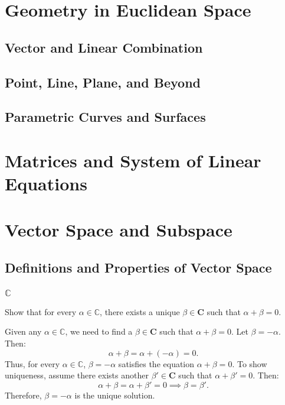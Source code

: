 \chapter{Geometry in Euclidean Space}
\section{Vector and Linear Combination}

\section{Point, Line, Plane, and Beyond}

\section{Parametric Curves and Surfaces}

\chapter{Matrices and System of Linear Equations}

\chapter{Vector Space and Subspace}

\section{Definitions and Properties of Vector Space}
\subsection{$\mathbb{C}$}
\begin{exercise}
Show that for every $\alpha \in \mathbb{C}$, there exists a unique $\beta \in \mathbf{C}$ such that $\alpha + \beta = 0$.
\end{exercise}

\begin{solution}
Given any $\alpha \in \mathbb{C}$, we need to find a $\beta \in \mathbf{C}$ such that $\alpha + \beta = 0$. Let $\beta = -\alpha$. Then:
\[
\alpha + \beta = \alpha + (-\alpha) = 0.
\]
Thus, for every $\alpha \in \mathbb{C}$, $\beta = -\alpha$ satisfies the equation $\alpha + \beta = 0$. To show uniqueness, assume there exists another $\beta' \in \mathbf{C}$ such that $\alpha + \beta' = 0$. Then:
\[
\alpha + \beta = \alpha + \beta' = 0 \implies \beta = \beta'.
\]
Therefore, $\beta = -\alpha$ is the unique solution.
\end{solution}

